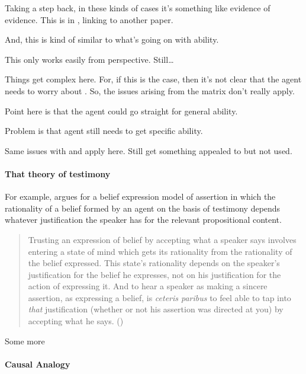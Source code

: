 \begin{note}
  Taking a step back, in these kinds of cases it's something like evidence of evidence.
  This is in \textcite[2]{Tal:2017uw}, linking to another paper.

  And, this is kind of similar to what's going on with ability.

  This only works easily from \AR{} perspective.
  Still\dots

  Things get complex here.
  For, if this is the case, then it's not clear that the agent needs to worry about .
  So, the issues arising from the matrix don't really apply.

  Point here is that the agent could go straight for general ability.

  Problem is that agent still needs to get specific ability.

  Same issues with \ESU{} and \nI{} apply here.
  Still get something appealed to but not used.
\end{note}

\paragraph{That theory of testimony}

\begin{note}
  For example, \citeauthor{Owens:2006tw} argues for a belief expression model of assertion in which the rationality of a belief formed by an agent on the basis of testimony depends whatever justification the speaker has for the relevant propositional content.
    \begin{quote}
      Trusting an expression of belief by accepting what a speaker says involves entering a state of mind which gets its rationality from the rationality of the belief expressed. This state's rationality depends on the speaker's justification for the belief he expresses, not on his justification for the action of expressing it. And to hear a speaker as making a sincere assertion, as expressing a belief, is \emph{ceteris paribus} to feel able to tap into \emph{that} justification (whether or not his assertion was directed at you) by accepting what he says.\nolinebreak
      \mbox{}\hfill\mbox{(\Citeyear[123]{Owens:2006tw})}
    \end{quote}
    \color{red} Some more
\end{note}

\paragraph{Causal Analogy}

